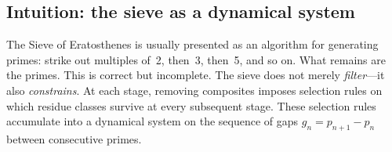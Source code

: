 \documentclass[12pt,a4paper]{article}
\begin{document}
\subsection{Intuition: the sieve as a dynamical system}
\label{sec:ch1_intuition}

The Sieve of Eratosthenes is usually presented as an algorithm for
generating primes: strike out multiples of~2, then~3, then~5, and so
on. What remains are the primes. This is correct but incomplete. The
sieve does not merely \emph{filter}---it also \emph{constrains}. At
each stage, removing composites imposes selection rules on which
residue classes survive at every subsequent stage. These selection
rules accumulate into a dynamical system on the sequence of gaps
$g_n = p_{n+1} - p_n$ between consecutive primes.
\end{document}
